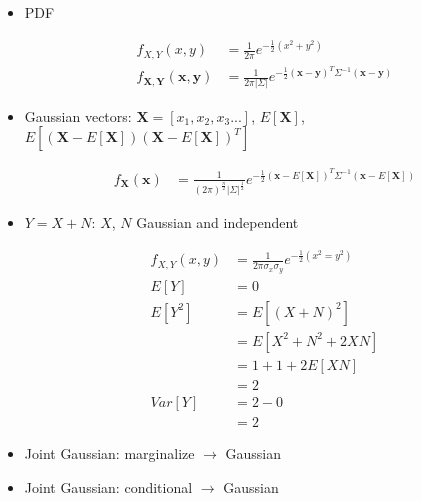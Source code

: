 \documentclass[11pt,letterpaper,titlepage]{article}
\renewcommand{\vec}[1]{\mathbf{#1}}
\begin{document}
\begin{itemize}

    \item PDF

    \begin{equation*}
        \begin{aligned}
            f_{X, Y}(x, y) &= \frac{1}{2 \pi} e^{-\frac{1}{2} (x^2 + y^2)} \\
            f_{\vec{X}, \vec{Y}}(\vec{x}, \vec{y}) &= \frac{1}{2 \pi |\Sigma|} e^{-\frac{1}{2}(\vec{x} - \vec{y})^{T} \Sigma^{-1}(\vec{x} - \vec{y})}
        \end{aligned}
    \end{equation*}
    
    \item Gaussian vectors: $ \vec{X} = [x_1, x_2, x_3...]$, $E[\vec{X}]$, $E[(\vec{X} - E[\vec{X}])(\vec{X} - E[\vec{X}])^T]$
    
    \begin{equation*}
        \begin{aligned}
            f_{\vec{X}}(\vec{x}) &= \frac{1}{(2 \pi)^{\frac{n}{2}} |\Sigma|^{\frac{1}{2}}} e^{-\frac{1}{2} (\vec{x} - E[\vec{X}])^{T} \Sigma^{-1}(\vec{x} - E[\vec{X}])}
        \end{aligned}
    \end{equation*}
    
    \item $Y = X + N$: $X$, $N$ Gaussian and independent
    
    \begin{equation*}
        \begin{aligned}
            f_{X, Y}(x, y) &= \frac{1}{2 \pi \sigma_x \sigma_y} e^{-\frac{1}{2} (x^2 = y^2)} \\
            E[Y] &= 0 \\
            E[Y^2] &= E[(X + N)^2] \\
            &= E[X^2 + N^2 + 2X N] \\
            &= 1 + 1 + 2 E[X N] \\
            &= 2 \\
            Var[Y] &= 2 - 0 \\
            &= 2
        \end{aligned}
    \end{equation*}
    
    \item Joint Gaussian: marginalize $\rightarrow$ Gaussian
    
    \item Joint Gaussian: conditional $\rightarrow$ Gaussian
    
\end{itemize}
\end{document}
